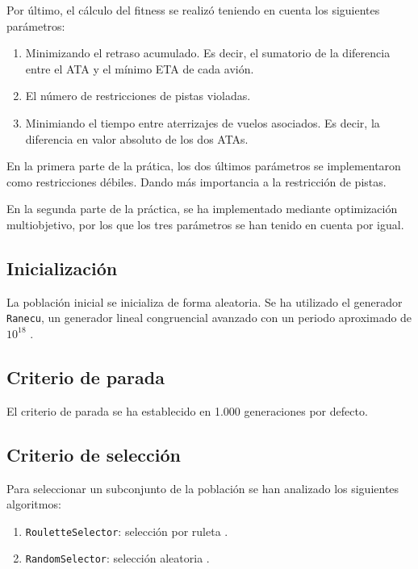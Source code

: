 \documentclass[a4paper,12pt,titlepage]{article}
\begin{document}
Por último, el cálculo del fitness se realizó teniendo en cuenta los siguientes parámetros:

\begin{enumerate}[noitemsep]
	\item Minimizando el retraso acumulado. Es decir, el sumatorio de la diferencia entre el ATA y el mínimo ETA de cada avión.
	\item El número de restricciones de pistas violadas.
	\item Minimiando el tiempo entre aterrizajes de vuelos asociados. Es decir, la diferencia en valor absoluto de los dos ATAs.
\end{enumerate}

En la primera parte de la prática, los dos últimos parámetros se implementaron como restricciones débiles. Dando más importancia a la restricción de pistas.

En la segunda parte de la práctica, se ha implementado mediante optimización multiobjetivo, por los que los tres parámetros se han tenido en cuenta por igual.

\subsection{Inicialización}

La población inicial se inicializa de forma aleatoria. Se ha utilizado el generador \lstinline|Ranecu|, un generador lineal congruencial avanzado con un periodo aproximado de $10^{18}$ \citep{jclec:ranecu}.

\subsection{Criterio de parada}

El criterio de parada se ha establecido en 1.000 generaciones por defecto.

\subsection{Criterio de selección}

Para seleccionar un subconjunto de la población se han analizado los siguientes algoritmos:

\begin{enumerate}[noitemsep]
	\item \lstinline|RouletteSelector|: selección por ruleta \citep{jclec:roulette}.
	\item \lstinline|RandomSelector|: selección aleatoria \citep{jclec:random}.
\end{enumerate}
\end{document}
